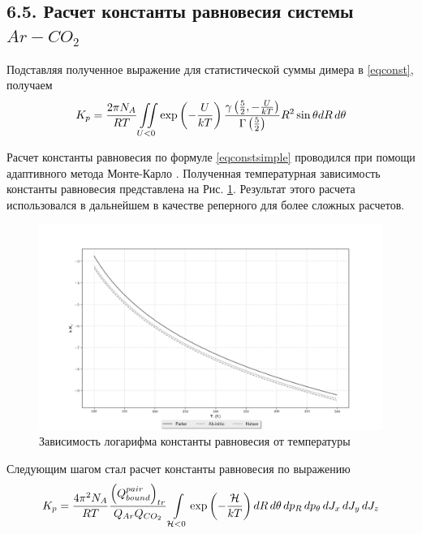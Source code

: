 \subsection*{\textbf{6.5.} Расчет константы равновесия системы $Ar-CO_2$}

Подставляя полученное выражение для статистической суммы димера в \eqref{eqconst}, получаем
\vverh
\begin{gather}
	K_p = \frac{2 \pi N_A}{R T} \iint\limits_{U < 0} \exp \left( - \frac{U}{k T} \right) \frac{\gamma \left( \frac{5}{2}, - \frac{U}{kT} \right)}{\Gamma \left( \frac{5}{2} \right)} R^2 \sin \theta d R \, d \theta \label{eqconstsimple}
\end{gather}

Расчет константы равновесия по формуле \eqref{eqconstsimple} проводился при помощи адаптивного метода Монте-Карло \cite{lepage1978, vegas}. Полученная температурная зависимость константы равновесия представлена на  Рис. \ref{fig:pic3}. Результат этого расчета использовался в дальнейшем в качестве реперного для более сложных расчетов. 
\vverh
\begin{figure}[!ht]
	\hspace*{-1.2cm}
	\includegraphics[width=1.1\textwidth]{pictures/all_eq_const.png}
	\caption{Зависимость логарифма константы равновесия от температуры}
	\label{fig:pic3}
\end{figure}

Следующим шагом стал расчет константы равновесия по выражению
\vverh
\begin{gather}
	K_p = \frac{4 \pi^2 N_A}{RT} \frac{ \left( Q_{bound}^{pair} \right)_{tr}}{Q_{Ar} Q_{CO_2}} \int\limits_{\mathcal{H} < 0} \exp \left( - \frac{\mathcal{H}}{k T} \right) d R \, d \theta \, d p_R \, d p_\theta \, d J_x \, d J_y \, d J_z \label{eqconstdim} 
\end{gather}

